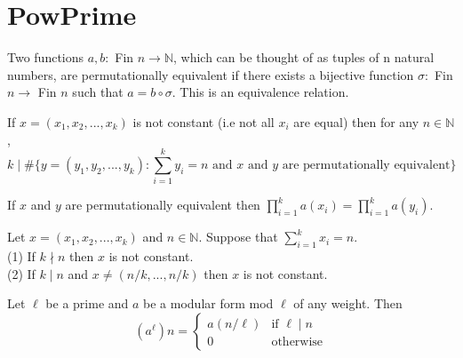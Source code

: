 \section{PowPrime}


\begin{definition} 
  \label{def:perm_equiv}
  \leanok
  Two functions $a, b : $ Fin $n \to \mathbb{N}$, which can be thought of as tuples of n natural numbers,
  are permutationally equivalent if there exists a bijective function $\sigma : $ Fin $n \to $ Fin $n$ such that 
  $a = b \circ \sigma$. This is an equivalence relation. 
\end{definition}

\begin{lemma}
  \label{lem:non_diag_vanish}
  \leanok
  If $x = (x_1, x_2, ..., x_k)$ is not constant (i.e not all $x_i$ are equal) then for any $n \in \mathbb{N}$,
  \[ k \mid \# \{y = (y_1, y_2, ..., y_k) : \sum_{i = 1}^k y_i = n \text{   and $x$ and $y$ are permutationally equivalent} \} \]
\end{lemma}

\begin{lemma}
  \label{lem:Pi_eq_of_perm_equiv}
  \leanok
  If $x$ and $y$ are permutationally equivalent then $\prod_{i = 1}^k a(x_i) = \prod_{i = 1}^k a(y_i)$.
\end{lemma}

\begin{lemma}
  \label{lem:non_const_of_tuple}
  \leanok
  Let $x = (x_1, x_2, ..., x_k)$ and $n \in \mathbb{N}$. Suppose that $\sum_{i = 1}^k x_i = n$. \\
  (1) If $k \nmid n$ then $x$ is not constant. \\
  (2) If $k \mid n$ and $x \neq (n/k, ..., n/k)$ then $x$ is not constant.
\end{lemma}

\begin{theorem} 
  \label{thm:Pow_Prime}
  \leanok
  Let $\ell$ be a prime and $a$ be a modular form mod $\ell$ of any weight. Then \\
  \[(a ^ \ell) n = \begin{cases} a (n / \ell) & \text{if $\ell \mid n$} \\
    0 & \text{otherwise} \end{cases} \]
\end{theorem}

